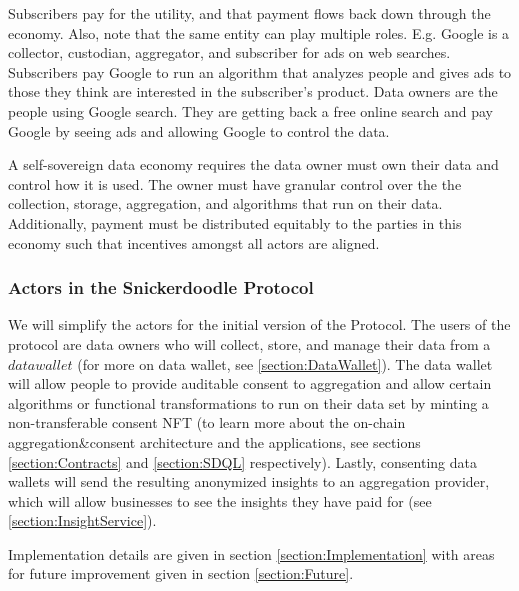 Subscribers pay for the utility, and that payment flows back down through the economy. Also, note that the same entity can play multiple roles. E.g. Google 
is a collector, custodian, aggregator, and subscriber for ads on web searches. Subscribers pay Google to run an algorithm that analyzes people 
and gives ads to those they think are interested in the subscriber's product. Data owners are the people using Google search. They are getting back a free 
online search and pay Google by seeing ads and allowing Google to control the data.

A self-sovereign data economy requires the data owner must own their data and control how it is used. The owner must have granular control over the 
the collection, storage, aggregation, and algorithms that run on their data. Additionally, payment must be distributed equitably to the parties in this 
economy such that incentives amongst all actors are aligned.

\subsubsection{Actors in the Snickerdoodle Protocol}
We will simplify the actors for the initial version of the Protocol. The users of the protocol are data owners who will collect, store, 
and manage their data from a $\mathit{data wallet}$ (for more on data wallet, see \ref{section:DataWallet}). The data wallet will allow people to 
provide auditable consent to aggregation and allow certain algorithms or functional transformations to run on their data set by minting a non-transferable consent NFT 
(to learn more about the on-chain aggregation\&consent architecture and the applications, see sections \ref{section:Contracts} and \ref{section:SDQL} respectively). 
Lastly, consenting data wallets will send the resulting anonymized insights to an aggregation provider, which will allow businesses to see the insights they have paid 
for (see \ref{section:InsightService}). 

Implementation details are given in section \ref{section:Implementation} with areas for future improvement given in section \ref{section:Future}.
